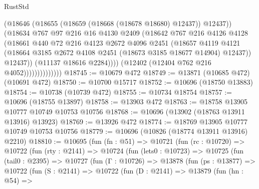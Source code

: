 \begin{lexlean}{RustStd}
\begin{coremodule}
                                (@18646 (@18655 (@18659 (@18668 (@18678 @18680) @12437)) @12437))
                                (@18634
                                  @767
                                  @97
                                  @216
                                  @16
                                  @4130
                                  @2409
                                  (@18642
                                    @767
                                    @216
                                    @4126
                                    @4128
                                    (@18661
                                      @440
                                      @72
                                      @216
                                      @4123
                                      @2672
                                      @4096
                                      @2451
                                      (@18657
                                        @4119
                                        @4121
                                        (@18664
                                          @3185
                                          @2672
                                          @4108
                                          @2451
                                          (@18673 @3185 @18677 @14904)
                                          @12437))
                                      @12437))
                                  (@11137 @18616 @2284))))
                            (@12402 (@12404 @762 @216 @4052))))))))))))))
@18745 := @10679 @472
@18749 := @13871 (@10685 @472) (@10691 @472)
@18750 := @10700 @15717
@18752 := @10696 (@18750 @13883)
@18754 := @10738 (@10739 @472)
@18755 := @10734 @18754
@18757 := @10696 (@18755 @13897)
@18758 := @13903 @472
@18763 := @18758 @13905 @10777 @10749 @10753 @10756
@18768 := @10696 (@13902 (@18763 @13911 @13916) @13923)
@18769 := @13926 @472
@18774 := @18769 @13905 @10777 @10749 @10753 @10756
@18779 := @10696 (@10826 (@18774 @13911 @13916) @2210)
@18810 := @10695
    (fun (fn : @51) =>
    @10721
      (fun (rc : @10720) =>
      @10722
        (fun (rty : @2141) =>
        @10724
          (fun (lets0 : @10723) =>
          @10725
            (fun (tail0 : @2395) =>
            @10727
              (fun (Γ : @10726) =>
              @13878
                (fun (ps : @13877) =>
                @10722
                  (fun (S : @2141) =>
                  @10722
                    (fun (D : @2141) =>
                    @13879
                      (fun (hn : @54) =>

\end{coremodule}
\end{lexlean}
